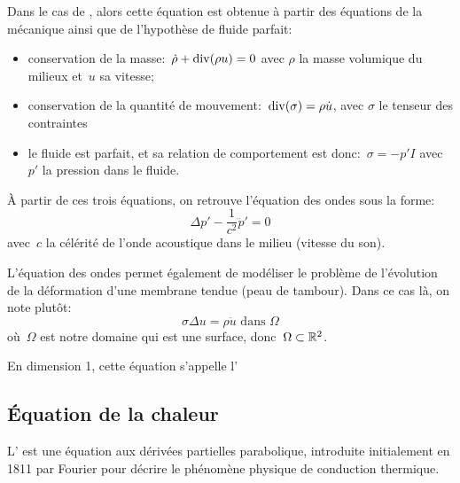 \medskip
Dans le cas de , alors cette équation est obtenue à partir des équations de la mécanique ainsi que de l'hypothèse de fluide parfait:
\begin{itemize}
  \item conservation de la masse:~$\dot{\rho}+\operatorname{div}(\rho u)=0$ avec 
	$\rho$ la masse volumique du milieux et~$u$ sa vitesse;
  \item conservation de la quantité de mouvement:~$\operatorname{div}(\sigma)=\rho\dot{u}$, avec
	$\sigma$ le tenseur des contraintes
  \item le fluide est parfait, et sa relation de comportement est donc:~$\sigma=-p'I$ avec
	$p'$ la pression dans le fluide.
\end{itemize}
\medskipvm
À partir de ces trois équations, on retrouve l'équation des ondes sous la forme:
\begin{equation}\label{Eq-EqOndeAcou}
\Delta p' - \dfrac1{c^2} \ddot{p}' = 0
\end{equation}
avec~$c$ la célérité de l'onde acoustique dans le milieu (vitesse du son).

\medskip
L'équation des ondes permet également de modéliser le problème de l'évolution de la déformation d'une membrane tendue (peau de tambour). Dans ce cas là, on note plutôt:
\begin{equation}
 \sigma \Delta u = \rho\ddot{u} \text{ dans }\Omega
\end{equation}
où~$\Omega$ est notre domaine qui est une surface, donc~$\Omega\subset\mathbb R^2$.

 En dimension 1, cette équation s'appelle l'


\medskip
\subsection{Équation de la chaleur}

L' est une équation aux dérivées partielles parabolique, introduite initialement en 1811 par Fourier pour décrire le phénomène physique de conduction thermique.

